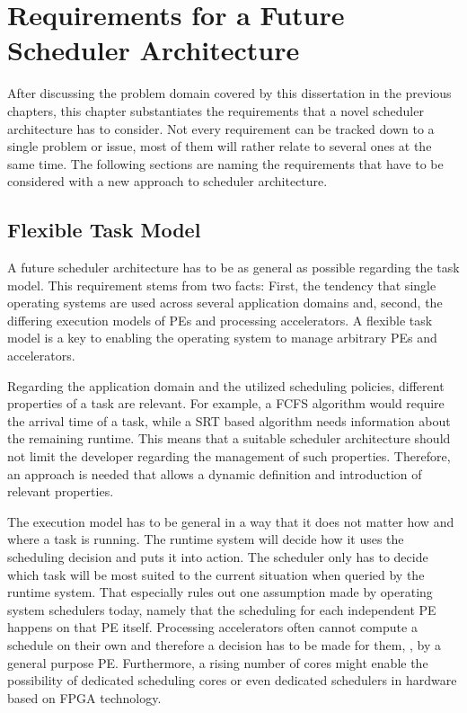 \chapter{Requirements for a Future Scheduler Architecture}%
\label{chap:requirements}

After discussing the problem domain covered by this dissertation in the previous chapters, this chapter substantiates the requirements that a novel scheduler architecture has to consider. Not every requirement can be tracked down to a single problem or issue, most of them will rather relate to several ones at the same time. The following sections are naming the requirements that have to be considered with a new approach to scheduler architecture.

\section{Flexible Task Model}

A future scheduler architecture has to be as general as possible regarding the task model. This requirement stems from two facts: First, the tendency that single operating systems are used across several application domains and, second, the differing execution models of \acp{PE} and processing accelerators. A flexible task model is a key to enabling the operating system to manage arbitrary \acp{PE} and accelerators.

Regarding the application domain and the utilized scheduling policies, different properties of a task are relevant. For example, a \ac{FCFS} algorithm would require the arrival time of a task, while a \ac{SRT} based algorithm needs information about the remaining runtime. This means that a suitable scheduler architecture should not limit the developer regarding the management of such properties. Therefore, an approach is needed that allows a dynamic definition and introduction of relevant properties.

The execution model has to be general in a way that it does not matter how and where a task is running. The runtime system will decide how it uses the scheduling decision and puts it into action. The scheduler only has to decide which task will be most suited to the current situation when queried by the runtime system. That especially rules out one assumption made by operating system schedulers today, namely that the scheduling for each independent \ac{PE} happens on that \ac{PE} itself. Processing accelerators often cannot compute a schedule on their own and therefore a decision has to be made for them, \eg, by a general purpose \ac{PE}. Furthermore, a rising number of cores might enable the possibility of dedicated scheduling cores or even dedicated schedulers in hardware based on \ac{FPGA} technology.

